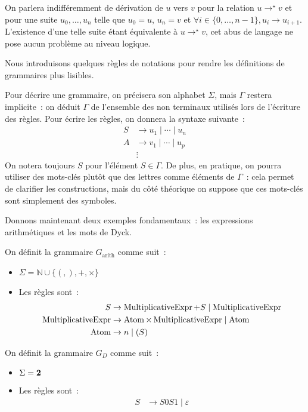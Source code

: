 \begin{remark}
  On parlera indifféremment de dérivation de $u$ vers $v$ pour la relation
  $u \to^\star v$ et pour une suite $u_0,\ldots,u_n$ telle que $u_0 = u$,
  $u_n = v$ et $\forall i \in \{0,\ldots,n-1\},u_i \to u_{i+1}$. L'existence
  d'une telle suite étant équivalente à $u \to^\star v$, cet abus de langage ne
  pose aucun problème au niveau logique.
\end{remark}

Nous introduisons quelques règles de notations pour rendre les définitions de
grammaires plus lisibles.

\begin{notation}
  Pour décrire une grammaire, on précisera son alphabet $\Sigma$, mais $\Gamma$
  restera implicite~: on déduit $\Gamma$ de l'ensemble des non terminaux
  utilisés lors de l'écriture des règles. Pour écrire les règles, on donnera la
  syntaxe suivante~:
  \begin{align*}
    S &\to u_1\mid \cdots\mid u_n\\
    A &\to v_1\mid\cdots\mid u_p\\
    &\vdots
  \end{align*}
  On notera toujours $S$ pour l'élément $S \in \Gamma$. De plus, en pratique, on
  pourra utiliser des mots-clés plutôt que des lettres comme éléments de
  $\Gamma$~: cela permet de clarifier les constructions, mais du côté théorique
  on suppose que ces mots-clés sont simplement des symboles.
\end{notation}

Donnons maintenant deux exemples fondamentaux~: les expressions arithmétiques et
les mots de Dyck.

\begin{example}
  On définit la grammaire $G_{\mathrm{arith}}$ comme suit~:
  \begin{itemize}
  \item $\Sigma = \mathbb N \cup \{(,),+,\times\}$
  \item Les règles sont~:
    \begin{align*}
      S &\to \operatorname{MultiplicativeExpr} + S \mid \operatorname{MultiplicativeExpr}\\
      \operatorname{MultiplicativeExpr} &\to \operatorname{Atom} \times \operatorname{MultiplicativeExpr} \mid \operatorname{Atom}\\
      \operatorname{Atom} &\to n \mid (S)
    \end{align*}
  \end{itemize}
  
  On définit la grammaire $G_D$ comme suit~:
  \begin{itemize}
  \item $\Sigma = \boldsymbol{2}$
  \item Les règles sont~:
    \begin{align*}
      S &\to S0S1\mid\varepsilon
    \end{align*}
  \end{itemize}
\end{example}


